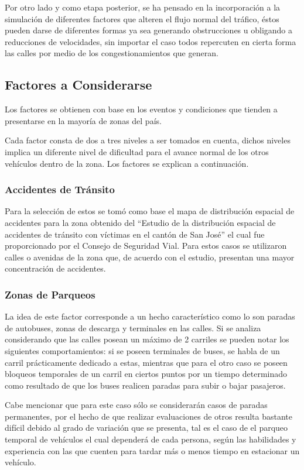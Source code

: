\documentclass[conference]{IEEEtran}
\begin{document}
	Por otro lado y como etapa posterior, se ha pensado en la incorporaci\'{o}n a la simulaci\'{o}n de diferentes factores que alteren el flujo normal del tr\'{a}fico, \'{e}stos pueden darse de diferentes formas ya sea generando obstrucciones u obligando a reducciones de velocidades, sin importar el caso todos repercuten en cierta forma las calles por medio de los congestionamientos que generan.
	
\subsection{Factores a Considerarse}
Los factores se obtienen con base en los eventos y condiciones que tienden a presentarse en la mayor\'{i}a de zonas del pa\'{i}s.

Cada factor consta de dos a tres niveles a ser tomados en cuenta, dichos niveles implica un diferente nivel de dificultad para el avance normal de los otros veh\'{i}culos dentro de la zona. Los factores se explican a continuaci\'{o}n.

\subsubsection{Accidentes de Tr\'{a}nsito}
Para la selecci\'{o}n de estos se tom\'{o} como base el mapa de distribuci\'{o}n espacial de accidentes para la zona obtenido del “Estudio de la distribuci\'{o}n espacial de accidentes de tr\'{a}nsito con v\'{i}ctimas en el cant\'{o}n de San Jos\'{e}” el cual fue proporcionado por el Consejo de Seguridad Vial. Para estos casos se utilizaron calles o avenidas de la zona que, de acuerdo con el estudio, presentan una mayor concentraci\'{o}n de accidentes.

\subsubsection{Zonas de Parqueos}
La idea de este  factor corresponde a un hecho caracter\'{i}stico como lo son paradas de autobuses, zonas de descarga y terminales en las calles. Si se analiza considerando que las calles posean un m\'{a}ximo de 2 carriles se pueden notar los siguientes comportamientos: si se poseen terminales de buses, se habla de un carril pr\'{a}cticamente dedicado a estas, mientras que para el otro caso se poseen bloqueos temporales de un carril en ciertos puntos por un tiempo determinado como resultado de que los buses realicen paradas para subir o bajar pasajeros. 

	Cabe mencionar que para este caso s\'{o}lo se considerar\'{a}n casos de paradas permanentes, por el hecho de que realizar evaluaciones de otros resulta bastante dif\'icil debido al grado de variaci\'on que se presenta, tal es el caso de el parqueo temporal de veh\'iculos el cual depender\'a de cada persona, seg\'un las habilidades y experiencia con las que cuenten para tardar m\'as o menos tiempo en estacionar un veh\'iculo.
\end{document}
